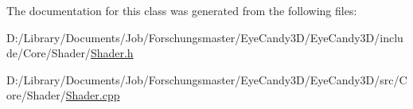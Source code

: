 The documentation for this class was generated from the following files\+:\begin{DoxyCompactItemize}
\item 
D\+:/\+Library/\+Documents/\+Job/\+Forschungsmaster/\+Eye\+Candy3\+D/\+Eye\+Candy3\+D/include/\+Core/\+Shader/\mbox{\hyperlink{_shader_8h}{Shader.\+h}}\item 
D\+:/\+Library/\+Documents/\+Job/\+Forschungsmaster/\+Eye\+Candy3\+D/\+Eye\+Candy3\+D/src/\+Core/\+Shader/\mbox{\hyperlink{_shader_8cpp}{Shader.\+cpp}}\end{DoxyCompactItemize}
